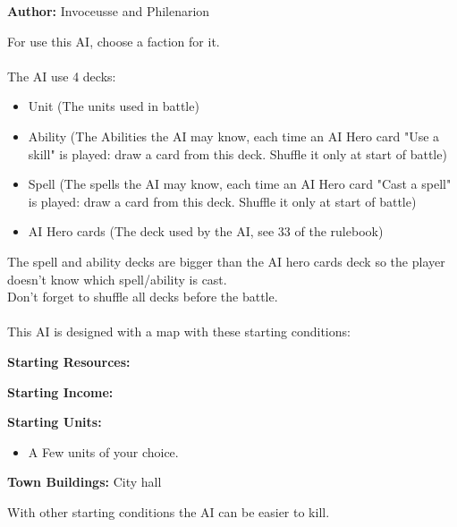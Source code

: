  
\textbf{Author:} Invoceusse and Philenarion

For use this AI, choose a faction for it.\\
\\

The AI use 4 decks:
\begin{itemize}
    \item Unit (The units used in battle)
    \item Ability (The Abilities the AI may know, each time an AI Hero card "Use a skill" is played: draw a card from this deck. Shuffle it only at start of battle)
    \item Spell (The spells the AI may know, each time an AI Hero card "Cast a spell" is played: draw a card from this deck. Shuffle it only at start of battle)
    \item AI Hero cards (The deck used by the AI, see 33 of the rulebook)
\end{itemize}


The spell and ability decks are bigger than the AI hero cards deck so the player doesn't know which spell/ability is cast. \\
Don’t forget to shuffle all decks before the battle.\\
\\

This AI is designed with a map with these starting conditions:

\textbf{Starting Resources:}\par
{}

\textbf{Starting Income:}\par
{}

\textbf{Starting Units:}
\begin{itemize}
    \item A Few  units of your choice.
\end{itemize}

\textbf{Town Buildings:} City hall

With other starting conditions the AI can be easier to kill. 

\newpage

